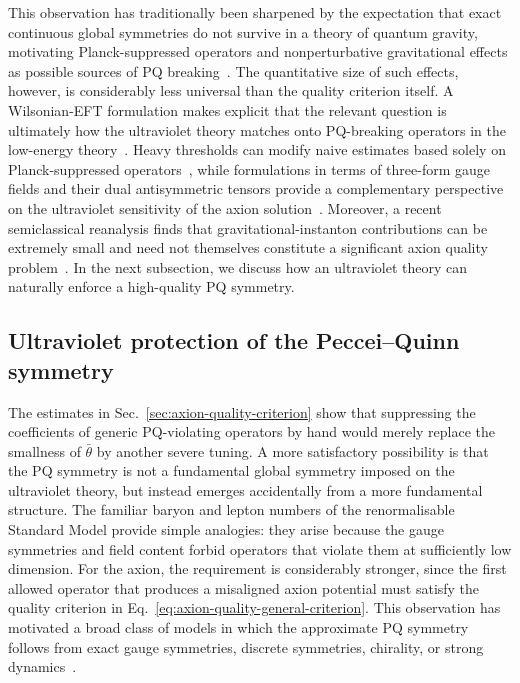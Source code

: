 \documentclass[review]{elsarticle}
\numberwithin{equation}{section}
\numberwithin{table}{section}
\numberwithin{figure}{section}
\begin{document}
This observation has traditionally been sharpened by the expectation that exact continuous global symmetries do not survive in a theory of quantum gravity, motivating Planck-suppressed operators and nonperturbative gravitational effects as possible sources of PQ breaking~\cite{Barr:1992qq,Holman:1992us,Kamionkowski:1992mf,Dobrescu:1996jp,Banks:2010zn,Alvey:2020nyh}. The quantitative size of such effects, however, is considerably less universal than the quality criterion itself. A Wilsonian-EFT formulation makes explicit that the relevant question is ultimately how the ultraviolet theory matches onto PQ-breaking operators in the low-energy theory~\cite{Dine:2022mjw}. Heavy thresholds can modify naive estimates based solely on Planck-suppressed operators~\cite{Bonnefoy:2022vop}, while formulations in terms of three-form gauge fields and their dual antisymmetric tensors provide a complementary perspective on the ultraviolet sensitivity of the axion solution~\cite{Dvali:2005an,Burgess:2023ifd}. Moreover, a recent semiclassical reanalysis finds that gravitational-instanton contributions can be extremely small and need not themselves constitute a significant axion quality problem~\cite{Catinari:2024zon}. In the next subsection, we discuss how an ultraviolet theory can naturally enforce a high-quality PQ symmetry.

\subsection{Ultraviolet protection of the Peccei--Quinn symmetry}
\label{sec:axion-quality-UV-protection}

The estimates in Sec.~\ref{sec:axion-quality-criterion} show that suppressing the coefficients of generic PQ-violating operators by hand would merely replace the smallness of $\bar\theta$ by another severe tuning. A more satisfactory possibility is that the PQ symmetry is not a fundamental global symmetry imposed on the ultraviolet theory, but instead emerges accidentally from a more fundamental structure. The familiar baryon and lepton numbers of the renormalisable Standard Model provide simple analogies: they arise because the gauge symmetries and field content forbid operators that violate them at sufficiently low dimension. For the axion, the requirement is considerably stronger, since the first allowed operator that produces a misaligned axion potential must satisfy the quality criterion in Eq.~\eqref{eq:axion-quality-general-criterion}. This observation has motivated a broad class of models in which the approximate PQ symmetry follows from exact gauge symmetries, discrete symmetries, chirality, or strong dynamics~\cite{Randall:1992ut,Redi:2016esr,Lillard:2018fdt,Gavela:2018paw,Ardu:2020qmo,Contino:2021ayn}.
\end{document}
